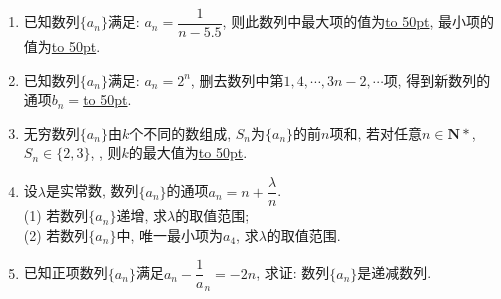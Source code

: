 \documentclass[10pt,a4paper]{article}
\newcommand{\blank}[1]{\underline{\hbox to #1pt{}}}
\begin{document}
\begin{enumerate}[1.]
\item 已知数列$\{a_n\}$满足: $a_n=\dfrac 1{n-5.5}$, 则此数列中最大项的值为\blank{50}, 最小项的值为\blank{50}.
\item 已知数列$\{a_n\}$满足: $a_n=2^n$, 删去数列中第$1,4,\cdots,3n-2,\cdots$项, 得到新数列的通项$b_n=$\blank{50}.
\item 无穷数列$\{a_n\}$由$k$个不同的数组成, $S_n$为$\{a_n\}$的前$n$项和, 若对任意$n\in \mathbf{N}*$, $S_n\in \{2,3\}$, , 则$k$的最大值为\blank{50}.
\item 设$\lambda$是实常数, 数列$\{a_n\}$的通项$a_n=n+\dfrac{\lambda}n$.\\
(1) 若数列$\{a_n\}$递增, 求$\lambda$的取值范围;\\
(2) 若数列$\{a_n\}$中, 唯一最小项为$a_4$, 求$\lambda$的取值范围.
\item 已知正项数列$\{a_n\}$满足$a_n-\dfrac 1a_n=-2n$, 求证: 数列$\{a_n\}$是递减数列.


\end{enumerate}
\end{document}
